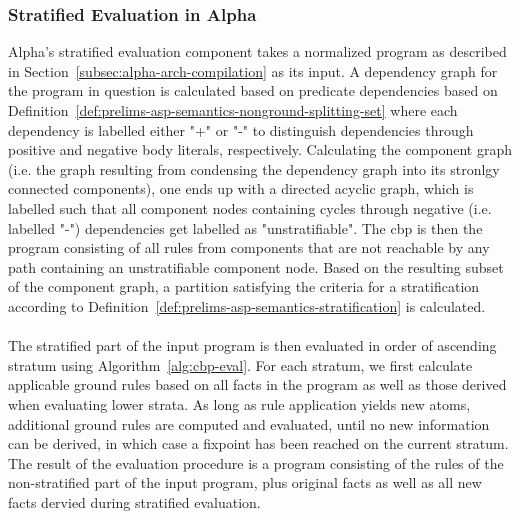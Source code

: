\subsubsection{Stratified Evaluation in Alpha~\cite{partial-eval}}
\label{subsubsec:impl-stratified-eval}

Alpha's stratified evaluation component takes a normalized program as described in Section~\ref{subsec:alpha-arch-compilation} as its input. A dependency graph for the program in question is calculated based on predicate dependencies based on Definition~\ref{def:prelims-asp-semantics-nonground-splitting-set} where each dependency is labelled either "+" or "-" to distinguish dependencies through positive and negative body literals, respectively. Calculating the component graph (i.e. the graph resulting from condensing the dependency graph into its stronlgy connected components), one ends up with a directed acyclic graph, which is labelled such that all component nodes containing cycles through negative (i.e. labelled "-") dependencies get labelled as "unstratifiable". The \gls{cbp} is then the program consisting of all rules from components that are not reachable by any path containing an unstratifiable component node. Based on the resulting subset of the component graph, a partition satisfying the criteria for a stratification according to Definition~\ref{def:prelims-asp-semantics-stratification} is calculated.\\
\\
The stratified part of the input program is then evaluated in order of ascending stratum using Algorithm~\ref{alg:cbp-eval}. For each stratum, we first calculate applicable ground rules based on all facts in the program as well as those derived when evaluating lower strata. As long as rule application yields new atoms, additional ground rules are computed and evaluated, until no new information can be derived, in which case a fixpoint has been reached on the current stratum. The result of the evaluation procedure is a program consisting of the rules of the non-stratified part of the input program, plus original facts as well as all new facts dervied during stratified evaluation.

